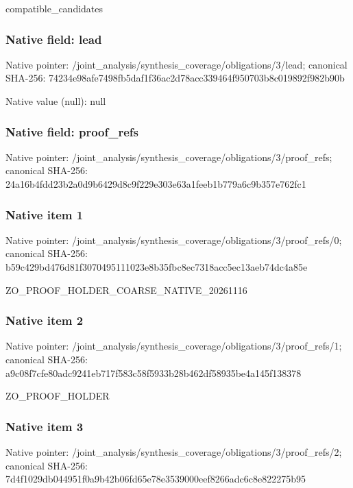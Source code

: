 \documentclass[10pt,a4paper]{article}
\begin{document}
\begingroup\raggedright\sloppy compatible\_\allowbreak{}candidates\par\endgroup

\subsubsection{Native field: lead}
Native pointer: /joint\_\allowbreak{}analysis/synthesis\_\allowbreak{}coverage/obligations/3/lead; canonical SHA-256: 74234e98afe7498fb5daf1f36ac2d78acc339464f950703b8c019892f982b90b

Native value (null): null

\subsubsection{Native field: proof\_\allowbreak{}refs}
Native pointer: /joint\_\allowbreak{}analysis/synthesis\_\allowbreak{}coverage/obligations/3/proof\_\allowbreak{}refs; canonical SHA-256: 24a16b4fdd23b2a0d9b6429d8c9f229e303e63a1feeb1b779a6c9b357e762fc1

\subsubsection{Native item 1}
Native pointer: /joint\_\allowbreak{}analysis/synthesis\_\allowbreak{}coverage/obligations/3/proof\_\allowbreak{}refs/0; canonical SHA-256: b59c429bd476d81f3070495111023e8b35fbc8ec7318acc5ec13aeb74dc4a85e

\begingroup\raggedright\sloppy ZO\_\allowbreak{}PROOF\_\allowbreak{}HOLDER\_\allowbreak{}COARSE\_\allowbreak{}NATIVE\_\allowbreak{}20261116\par\endgroup

\subsubsection{Native item 2}
Native pointer: /joint\_\allowbreak{}analysis/synthesis\_\allowbreak{}coverage/obligations/3/proof\_\allowbreak{}refs/1; canonical SHA-256: a9c08f7cfe80adc9241eb717f583c58f5933b28b462df58935be4a145f138378

\begingroup\raggedright\sloppy ZO\_\allowbreak{}PROOF\_\allowbreak{}HOLDER\par\endgroup

\subsubsection{Native item 3}
Native pointer: /joint\_\allowbreak{}analysis/synthesis\_\allowbreak{}coverage/obligations/3/proof\_\allowbreak{}refs/2; canonical SHA-256: 7d4f1029db044951f0a9b42b06fd65e78e3539000eef8266adc6c8e822275b95
\end{document}
